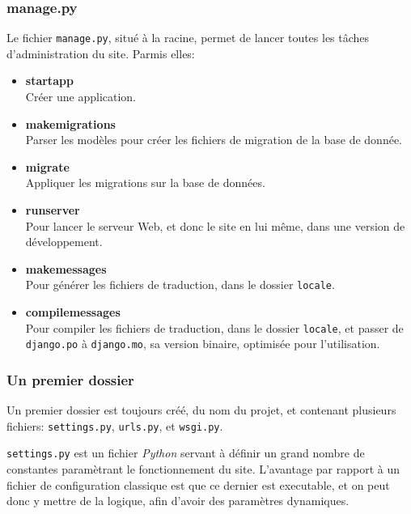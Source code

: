 \documentclass[a4paper]{report}
\begin{document}
\subsubsection{manage.py}
\label{ssub:manage.py}

\par Le fichier \verb-manage.py-, situé à la racine, permet de lancer toutes les tâches d'administration du site. Parmis
elles:
\begin{itemize}
    \item \textbf{startapp} \\
        Créer une application.
    \item \textbf{makemigrations} \\
        Parser les modèles pour créer les fichiers de migration de la base de donnée.
    \item \textbf{migrate} \\
        Appliquer les migrations sur la base de données.
    \item \textbf{runserver} \\
        Pour lancer le serveur Web, et donc le site en lui même, dans une version de développement.
    \item \textbf{makemessages} \\
        Pour générer les fichiers de traduction, dans le dossier \verb#locale#.
    \item \textbf{compilemessages} \\
        Pour compiler les fichiers de traduction, dans le dossier \verb#locale#, et passer de \verb#django.po# à
        \verb#django.mo#, sa version binaire, optimisée pour l'utilisation.
\end{itemize}

\subsubsection{Un premier dossier}
\label{ssub:Un premier dossier}
\par Un premier dossier est toujours créé, du nom du projet, et contenant plusieurs fichiers: \verb#settings.py#,
\verb#urls.py#, et \verb#wsgi.py#.

\par \verb#settings.py# est un fichier \emph{Python} servant à définir un grand nombre de constantes paramètrant le
fonctionnement du site. L'avantage par rapport à un fichier de configuration classique est que ce dernier est
executable, et on peut donc y mettre de la logique, afin d'avoir des paramètres dynamiques.
\end{document}

